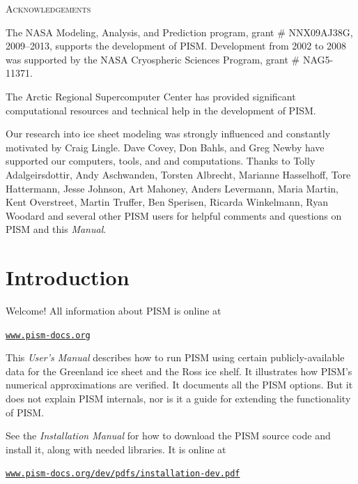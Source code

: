 \documentclass[11pt,final]{amsart}
\renewcommand{\t}[1]{\texttt{#1}}
\begin{document}
\centerline{\textsc{Acknowledgements}}
\bigskip

The NASA Modeling, Analysis, and Prediction program, grant \# NNX09AJ38G, 2009--2013, supports the development of PISM.  Development from 2002 to 2008 was supported by the NASA Cryospheric Sciences Program, grant \# NAG5-11371.

The Arctic Regional Supercomputer Center has provided significant computational resources and technical help in the development of PISM.

Our research into ice sheet modeling was strongly influenced and constantly motivated by Craig Lingle.  Dave Covey, Don Bahls, and Greg Newby have supported our computers, tools, and and computations.  Thanks to Tolly Adalgeirsdottir, Andy Aschwanden, Torsten Albrecht, Marianne Hasselhoff, Tore Hattermann, Jesse Johnson, Art Mahoney, Anders Levermann, Maria Martin, Kent Overstreet, Martin Truffer, Ben Sperisen, Ricarda Winkelmann, Ryan Woodard and several other PISM users for helpful comments and questions on PISM and this \emph{Manual}.

\newpage
\setcounter{tocdepth}{2}
\small
\tableofcontents
\normalsize

\newpage
\section{Introduction}\label{sect:intro}

Welcome!  All information about PISM is online at
\begin{center}
  \href{http://www.pism-docs.org}{\t{www.pism-docs.org}}
\end{center}

This \emph{User's Manual} describes how to run PISM using certain publicly-available data for the Greenland ice sheet and the Ross ice shelf.  It illustrates how PISM's numerical approximations are verified.  It documents all the PISM options.  But it does not explain PISM internals, nor is it a guide for extending the functionality of PISM.

See the \emph{Installation Manual} for how to download the PISM source code and install it, along with needed libraries.  It is online at
   \begin{center}
     \href{http://www.pism-docs.org/dev/pdfs/installation-dev.pdf}{\t{www.pism-docs.org/dev/pdfs/installation-dev.pdf}}
   \end{center}
\end{document}
